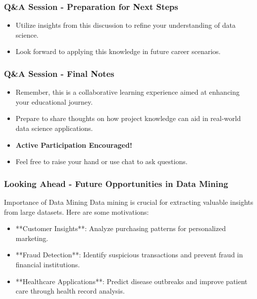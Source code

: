 \documentclass[aspectratio=169]{beamer}
\begin{document}
\begin{frame}[fragile]
    \frametitle{Q\&A Session - Preparation for Next Steps}
    \begin{itemize}
        \item Utilize insights from this discussion to refine your understanding of data science.
        \item Look forward to applying this knowledge in future career scenarios.
    \end{itemize}
\end{frame}

\begin{frame}[fragile]
    \frametitle{Q\&A Session - Final Notes}
    \begin{itemize}
        \item Remember, this is a collaborative learning experience aimed at enhancing your educational journey.
        \item Prepare to share thoughts on how project knowledge can aid in real-world data science applications.
        \item \textbf{Active Participation Encouraged!}
        \item Feel free to raise your hand or use chat to ask questions.
    \end{itemize}
\end{frame}

\begin{frame}[fragile]
    \frametitle{Looking Ahead - Future Opportunities in Data Mining}
    \begin{block}{Importance of Data Mining}
        Data mining is crucial for extracting valuable insights from large datasets. Here are some motivations:
        \begin{itemize}
            \item **Customer Insights**: Analyze purchasing patterns for personalized marketing.
            \item **Fraud Detection**: Identify suspicious transactions and prevent fraud in financial institutions.
            \item **Healthcare Applications**: Predict disease outbreaks and improve patient care through health record analysis.
        \end{itemize}
    \end{block}
\end{frame}
\end{document}
